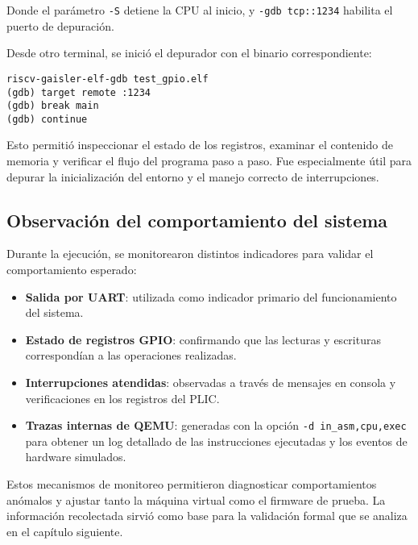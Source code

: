 Donde el parámetro \texttt{-S} detiene la CPU al inicio, y \texttt{-gdb tcp::1234} habilita el puerto de depuración.

Desde otro terminal, se inició el depurador con el binario correspondiente:

\begin{verbatim}
riscv-gaisler-elf-gdb test_gpio.elf
(gdb) target remote :1234
(gdb) break main
(gdb) continue
\end{verbatim}

Esto permitió inspeccionar el estado de los registros, examinar el contenido de memoria y verificar el flujo del programa paso a paso. Fue especialmente útil para depurar la inicialización del entorno y el manejo correcto de interrupciones.

\subsection*{Observación del comportamiento del sistema}

Durante la ejecución, se monitorearon distintos indicadores para validar el comportamiento esperado:

\begin{itemize}
    \item \textbf{Salida por UART}: utilizada como indicador primario del funcionamiento del sistema.
    \item \textbf{Estado de registros GPIO}: confirmando que las lecturas y escrituras correspondían a las operaciones realizadas.
    \item \textbf{Interrupciones atendidas}: observadas a través de mensajes en consola y verificaciones en los registros del PLIC.
    \item \textbf{Trazas internas de QEMU}: generadas con la opción \texttt{-d in\_asm,cpu,exec} para obtener un log detallado de las instrucciones ejecutadas y los eventos de hardware simulados.
\end{itemize}

Estos mecanismos de monitoreo permitieron diagnosticar comportamientos anómalos y ajustar tanto la máquina virtual como el firmware de prueba. La información recolectada sirvió como base para la validación formal que se analiza en el capítulo siguiente.

